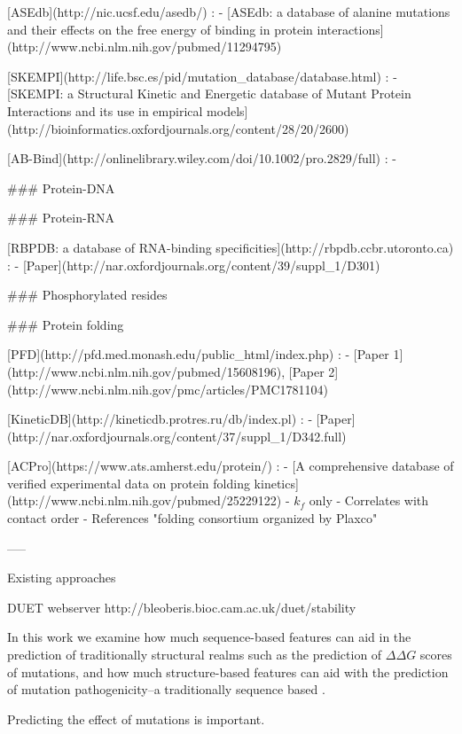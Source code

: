 [ASEdb](http://nic.ucsf.edu/asedb/)
: - [ASEdb: a database of alanine mutations and their effects on the free energy of binding in protein interactions](http://www.ncbi.nlm.nih.gov/pubmed/11294795)

[SKEMPI](http://life.bsc.es/pid/mutation_database/database.html)
: - [SKEMPI: a Structural Kinetic and Energetic database of Mutant Protein Interactions and its use in empirical models](http://bioinformatics.oxfordjournals.org/content/28/20/2600)

[AB-Bind](http://onlinelibrary.wiley.com/doi/10.1002/pro.2829/full)
: -



### Protein-DNA




### Protein-RNA

[RBPDB: a database of RNA-binding specificities](http://rbpdb.ccbr.utoronto.ca)
: - [Paper](http://nar.oxfordjournals.org/content/39/suppl_1/D301)


### Phosphorylated resides




### Protein folding

[PFD](http://pfd.med.monash.edu/public_html/index.php)
: - [Paper 1](http://www.ncbi.nlm.nih.gov/pubmed/15608196), [Paper 2](http://www.ncbi.nlm.nih.gov/pmc/articles/PMC1781104)


[KineticDB](http://kineticdb.protres.ru/db/index.pl)
: - [Paper](http://nar.oxfordjournals.org/content/37/suppl_1/D342.full)


[ACPro](https://www.ats.amherst.edu/protein/)
: - [A comprehensive database of verified experimental data on protein folding kinetics](http://www.ncbi.nlm.nih.gov/pubmed/25229122)
  - $k_{f}$ only
  - Correlates with contact order
  - References "folding consortium organized by Plaxco"





-----


Existing approaches


DUET webserver http://bleoberis.bioc.cam.ac.uk/duet/stability

In this work we examine how much sequence-based features can aid in the prediction of traditionally structural realms such as the prediction of $\Delta \Delta G$ scores of mutations, and how much structure-based features can aid with the prediction of mutation pathogenicity--a traditionally sequence based .

Predicting the effect of mutations is important.



